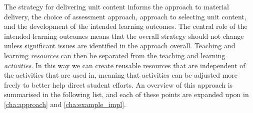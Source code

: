 The strategy for delivering unit content informs the approach to material delivery, the choice of assessment approach, approach to selecting unit content, and the development of the intended learning outcomes. The central role of the intended learning outcomes means that the overall strategy should not change unless significant issues are identified in the approach overall. Teaching and learning \emph{resources} can then be separated from the teaching and learning \emph{activities}. In this way we can create reusable resources that are independent of the activities that are used in, meaning that activities can be adjusted more freely to better help direct student efforts. An overview of this approach is summarised in the following list, and each of these points are expanded upon in \cref{cha:approach} and \cref{cha:example_impl}.

%
%
%
%


